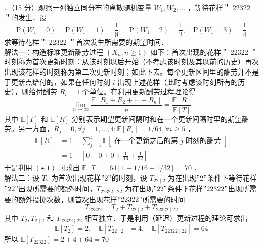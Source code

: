 \documentclass[UTF8]{ctexart}
\begin{document}
．（15 分）观察一列独立同分布的离散随机变量 $W_{1}, W_{2}, \ldots$ ，等待花样＂ 22322 ＂的发生．设
$$
\mathrm{P}\left(W_{1}=0\right)=\mathrm{P}\left(W_{1}=1\right)=\frac{1}{8}, \quad \mathrm{P}\left(W_{1}=2\right)=\frac{1}{2}, \quad \mathrm{P}\left(W_{1}=3\right)=\frac{1}{4}
$$
求等待花样＂ 22322 ＂首次发生所需要的期望时间．\\
解法一：构造标准更新酬劳过程 $\left\{X_{n}, n \geq 1\right\}$ 如下：首次出现的花样＂ 22322 ＂时刻称为首次更新时刻：从该时刻以后开始（不考虑该时刻及其以前的历史）再次出现该花样的时刻称为第二次更新时刻；如此下去。每个更新区间里的酬劳并不是于更新点给付的，如果在任何时刻 $i$ 出现上述花样（此时考虑该时刻所有的历史），则给付酬劳 $R_{i}=1$ 个单位。在利用更新酬劳过程理论得
\begin{equation*}
	\lim _{n \rightarrow \infty} \frac{\mathbb{E}\left[R_{1}+R_{2}+\cdots+R_{n}\right]}{n}=\frac{\mathbb{E} [R]}{\mathbb{E} [T]} \tag{$\star$.1}
\end{equation*}
其中 $\mathbb{E} [T]$ 和 $\mathbb{E} [R]$ 分别表示期望更新间隔时和在一个更新间隔时里的期望酬劳。另一方面，$R_{j}=0, \forall j=1, \ldots, 4 ; \mathbb{E} [R_{i}]=1 / 64, \forall i \geq 5$ ，
$$
\begin{aligned}
	\mathbb{E} [R] & =1+\sum_{j=1}^{4} \mathbb{E}[\text { 在一个更新之后的第 } j \text { 时刻的酬劳 }] \\
	& =1+\left[0+0+0+\frac{1}{16}+\frac{1}{32}\right]
\end{aligned}
$$
于是利用 $(\star .1)$ 可求出 $\mathbb{E} [T]=64[1+1 / 16+1 / 32]=70$ ．\\
解法二：设 $T_{2}$ 为首次出现花样$"2"$的时刻，设 $T_{22 \mid 2}$ 为在出现$"2"$条件下等待花样$"22"$出现所需要的额外时间，$T_{22322 \mid 22}$ 为在出现$"22"$条件下花样$"22322"$出现所需要的额外投掷次数，则首次出现花样$"22322"$所需要的时间
$$
T_{22322}=T_{2}+T_{22 \mid 2}+T_{22322 \mid 22}
$$
其中 $T_{2}, T_{2 \mid 2}$ 和 $T_{22322 \mid 22}$ 相互独立．于是利用（延迟）更新过程的理论可求出
$$
\mathbb{E} [T_{2}]=2, \quad \mathbb{E} [T_{22 \mid 2}]=4, \quad \mathbb{E} [T_{22322 \mid 22}]=64
$$
所以 $\mathbb{E}[T_{22322}]=2+4+64=70$\\
\end{document}
